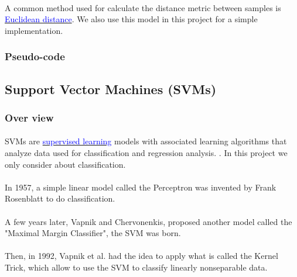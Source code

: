\paragraph*{}
A common method used for calculate the distance metric between samples is \href{https://en.wikipedia.org/wiki/Euclidean_distance}{\textcolor{blue}{Euclidean distance}}. We also use this model in this project for a simple implementation.

\subsubsection*{Pseudo-code}


\subsection{Support Vector Machines (SVMs)}
\subsubsection*{Over view}
\paragraph*{}
SVMs are \href{https://en.wikipedia.org/wiki/Supervised_learning}{\textcolor{blue}{supervised learning}} models with associated learning algorithms that analyze data used for classification and regression analysis. \cite{WIKI:0}. In this project we only consider about classification.

\paragraph*{}
In 1957, a simple linear model called the Perceptron was invented by Frank Rosenblatt to do classification.

\paragraph*{}
A few years later,  Vapnik and Chervonenkis, proposed another model called the "Maximal Margin Classifier", the SVM was born.

\paragraph*{}
Then, in 1992, Vapnik et al. had the idea to apply what is called the Kernel Trick, which allow to use the SVM to classify linearly nonseparable data.


